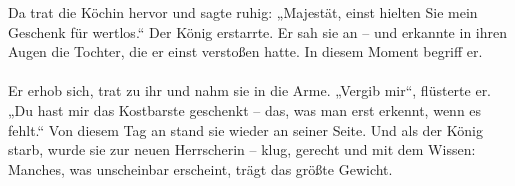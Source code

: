 Da trat die Köchin hervor und sagte ruhig:
„Majestät, einst hielten Sie mein Geschenk für wertlos.“
Der König erstarrte. Er sah sie an – und erkannte in ihren Augen die Tochter, die er einst verstoßen hatte. In diesem Moment begriff er.\\ \\
Er erhob sich, trat zu ihr und nahm sie in die Arme.
„Vergib mir“, flüsterte er. „Du hast mir das Kostbarste geschenkt – das, was man erst erkennt, wenn es fehlt.“
Von diesem Tag an stand sie wieder an seiner Seite. Und als der König starb, wurde sie zur neuen Herrscherin – klug, gerecht und mit dem Wissen: Manches, was unscheinbar erscheint, trägt das größte Gewicht.\\ \\
